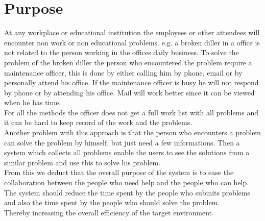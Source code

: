 \newcommand{\lightbulb}{diller}
\section{Purpose}
At any workplace or educational institution the employees or other attendees will encounter non work or non educational problems. 
e.g. a broken \lightbulb{} in a office is not related to the person working in the offices daily business. 
To solve the problem of the broken \lightbulb{} the person who encountered the problem require a maintenance officer, this is done by either calling him by phone, email or by personally attend his office. 
If the maintenance officer is busy he will not respond by phone or by attending his office. Mail will work better since it can be viewed when he has time.\\

For all the methods the officer does not get a full work list with all problems and it can be hard to keep record of the work and the problems.\\
Another problem with this approach is that the person who encounters a problem can solve the problem by himself, but just need a few informations. Then a system which collects all problems enable the users to see the solutions from a similar problem and use this to solve his problem. \\

From this we deduct that the overall purpose of the system is to ease the collaboration between the people who need help and the people who can help. \\
The system should reduce the time spent by the people who submits problems and also the time spent by the people who should solve the problem. \\
Thereby increasing the overall efficiency of the target environment. 

